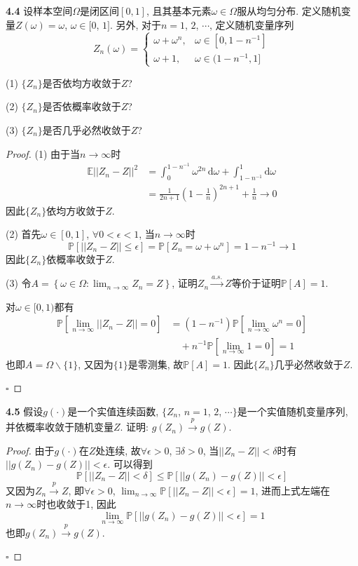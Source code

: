 \documentclass[cn,12pt,math=mtpro2,citestyle=gb7714-2015,bibstyle=gb7714-2015,twocol,mode=simple]{elegantbook}
\newcommand{\E}{\mathbb{E}}
\begin{document}
\textbf{4.4} 设样本空间$\Omega$是闭区间$[0,1]$, 且其基本元素$\omega \in \Omega$服从均匀分布. 定义随机变量$Z(\omega)=\omega$, $\omega\in[0$, $1]$. 另外, 对于$n=1$, $2$, $\cdots$, 定义随机变量序列
$$Z_n(\omega)=\left\{\begin{matrix}
 \omega+\omega^n, & \omega\in[0,1-n^{-1}]\\
 \omega+1, & \omega\in(1-n^{-1},1]
\end{matrix}\right.$$

(1) $\{Z_n\}$是否依均方收敛于$Z$?

(2) $\{Z_n\}$是否依概率收敛于$Z$?

(3) $\{Z_n\}$是否几乎必然收敛于$Z$?

 \begin{proof}
   (1) 由于当$n\rightarrow\infty$时
   \begin{align*}
   \E||Z_n-Z||^2&=\int_{0}^{1-n^{-1}}\omega^{2n}\,\text{d}\omega+\int_{1-n^{-1}}^{1}\text{d}\omega \\
&=\frac{1}{2n+1}\left(1-\frac{1}{n}\right)^{2n+1}+\frac{1}{n}\to0
\end{align*}
   因此$\{Z_n\}$依均方收敛于$Z$.

   (2) 首先$\omega \in [0,1]$, $\forall 0<\epsilon<1$, 当$n\rightarrow\infty$时
   $$\mathbb{P}[||Z_n-Z||\leq\epsilon]=\mathbb{P}[Z_n=\omega+\omega^n]=1-n^{-1}\rightarrow 1$$
   因此$\{Z_n\}$依概率收敛于$Z$.

   (3) 令$\displaystyle A=\left\{\omega\in\Omega: \lim_{n \to \infty}Z_n=Z\right\}$, 证明$Z_n \xrightarrow{a.s.} Z$等价于证明$\mathbb{P}[A]=1$.

   对$\omega \in [0,1)$都有
   \begin{align*}
   \mathbb{P}\left[\lim_{n \to \infty}||Z_n-Z||=0\right]&=(1-n^{-1})\mathbb{P}\left[\lim_{n \to \infty}\omega^n=0\right] \\
   &\quad+n^{-1}\mathbb{P}\left[\lim_{n \to \infty}1=0\right]=1
   \end{align*}
   也即$A=\Omega\backslash\{1\}$, 又因为$\{1\}$是零测集, 故$\mathbb{P}[A]=1$. 因此$\{Z_n\}$几乎必然收敛于$Z$.

   $\square$
 \end{proof}

\textbf{4.5} 假设$g(\cdot)$是一个实值连续函数, $\{Z_n$, $n=1$, $2$, $\cdots\}$是一个实值随机变量序列, 并依概率收敛于随机变量$Z$. 证明: $g(Z_n)\xrightarrow{p}g(Z)$.

 \begin{proof}
   由于$g(\cdot)$在$Z$处连续, 故$\forall \epsilon>0$, $\exists \delta>0$, 当$||Z_n-Z||<\delta$时有$||g(Z_n)-g(Z)||<\epsilon$.  可以得到
   $$\mathbb{P}[||Z_n-Z||<\delta]\leq \mathbb{P}[||g(Z_n)-g(Z)||<\epsilon]$$
   又因为$Z_n\xrightarrow{p}Z$, 即$\forall \epsilon>0$, $\displaystyle\lim_{n\to\infty}\mathbb{P}[||Z_n-Z||<\epsilon]=1$, 进而上式左端在$n\rightarrow\infty$时也收敛于1, 因此
   $$\lim_{n\to\infty}\mathbb{P}[||g(Z_n)-g(Z)||<\epsilon]=1$$
   也即$g(Z_n)\xrightarrow{p}g(Z)$.

   $\square$
 \end{proof}
\end{document}
